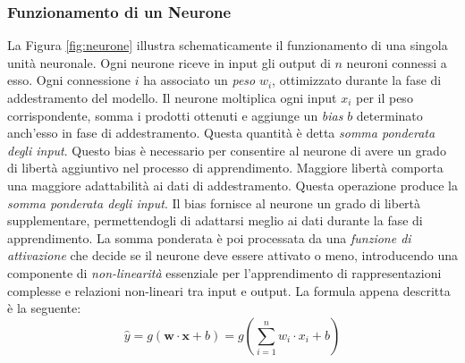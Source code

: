 \documentclass[12pt,a4paper,twoside,openright]{book}
\begin{document}
\subsubsection{Funzionamento di un Neurone}
La Figura \ref{fig:neurone} illustra schematicamente il funzionamento di una singola unità neuronale. Ogni neurone riceve in input gli output di $n$ neuroni connessi a esso. Ogni connessione $i$ ha associato un \emph{peso} $w_i$, ottimizzato durante la fase di addestramento del modello. Il neurone moltiplica ogni input $x_i$ per il peso corrispondente, somma i prodotti ottenuti e aggiunge un \emph{bias} $b$ determinato anch'esso in fase di addestramento. Questa quantità è detta \emph{somma ponderata degli input}.
Questo bias è necessario per consentire al neurone di avere un grado di libertà aggiuntivo nel processo di apprendimento. Maggiore libertà comporta una maggiore adattabilità ai dati di addestramento.
Questa operazione produce la \emph{somma ponderata degli input}. Il bias fornisce al neurone un grado di libertà supplementare, permettendogli di adattarsi meglio ai dati durante la fase di apprendimento. La somma ponderata è poi processata da una \emph{funzione di attivazione} che decide se il neurone deve essere attivato o meno, introducendo una componente di \emph{non-linearità} essenziale per l'apprendimento di rappresentazioni complesse e relazioni non-lineari tra input e output. La formula appena descritta è la seguente:
\begin{equation*}
    \hat{y} = g(\mathbf{w \cdot x} + b) = g\left( \sum_{i=1}^n w_i \cdot x_i + b \right) 
\end{equation*}
\end{document}
